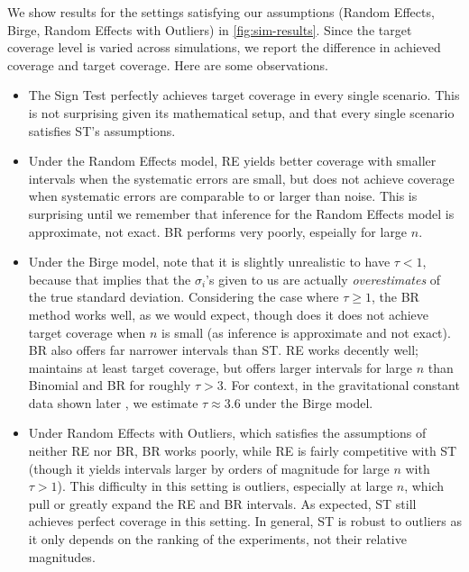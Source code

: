 \documentclass[letterpaper,12pt]{article}
\begin{document}
We show results for the settings satisfying our assumptions (Random Effects, Birge, Random Effects with Outliers) in \ref{fig:sim-results}. Since the target coverage level is varied across simulations, we report the difference in achieved coverage and target coverage. Here are some observations.

\begin{itemize}
\item
  The Sign Test perfectly achieves target coverage in every single scenario. This is not surprising given its mathematical setup, and that every single scenario satisfies ST's assumptions.
\item
  Under the Random Effects model, RE yields better coverage with smaller intervals when the systematic errors are small, but does not achieve coverage when systematic errors are comparable to or larger than noise. This is surprising until we remember that inference for the Random Effects model is approximate, not exact. BR performs very poorly, espeially for large $n$.
\item
  Under the Birge model, note that it is slightly unrealistic to have $\tau<1$, because that implies that the $\sigma_i$'s given to us are actually \emph{overestimates} of the true standard deviation. Considering the case where $\tau\geq 1$, the BR method works well, as we would expect, though does it does not achieve target coverage when $n$ is small (as inference is approximate and not exact). BR also offers far narrower intervals than ST. RE works decently well; maintains at least target coverage, but offers larger intervals for large $n$ than Binomial and BR for roughly $\tau>3$. For context, in the gravitational constant data shown later \citep{tiesinga2021codata}, we estimate $\tau\approx 3.6$ under the Birge model.
\item
  Under Random Effects with Outliers, which satisfies the assumptions of neither RE nor BR, BR works poorly, while RE is fairly competitive with ST (though it yields intervals larger by orders of magnitude for large $n$ with $\tau>1$). This difficulty in this setting is outliers, especially at large $n$, which pull or greatly expand the RE and BR intervals. As expected, ST still achieves perfect coverage in this setting. In general, ST is robust to outliers as it only depends on the ranking of the experiments, not their relative magnitudes.
\end{itemize}
\end{document}
